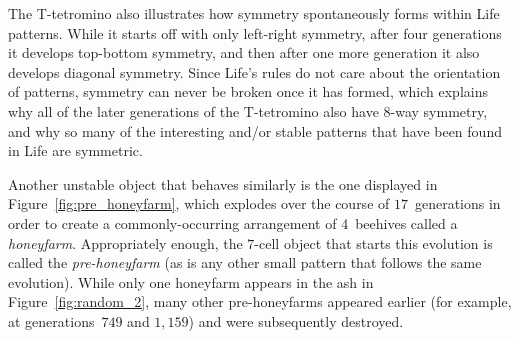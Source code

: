 The T-tetromino also illustrates how symmetry spontaneously forms within Life patterns. While it starts off with only left-right symmetry, after four generations it develops top-bottom symmetry, and then after one more generation it also develops diagonal symmetry. Since Life's rules do not care about the orientation of patterns, symmetry can never be broken once it has formed, which explains why all of the later generations of the T-tetromino also have $8$-way symmetry, and why so many of the interesting and/or stable patterns that have been found in Life are symmetric.

Another unstable object that behaves similarly is the one displayed in Figure~\ref{fig:pre_honeyfarm}, which explodes over the course of $17$~generations in order to create a commonly-occurring arrangement of $4$~beehives called a \emph{honeyfarm}. Appropriately enough, the $7$-cell object that starts this evolution is called the \emph{pre-honeyfarm} (as is any other small pattern that follows the same evolution). While only one honeyfarm appears in the ash in Figure~\ref{fig:random_2}, many other pre-honeyfarms appeared earlier (for example, at generations~$749$ and $1,159$) and were subsequently destroyed.

